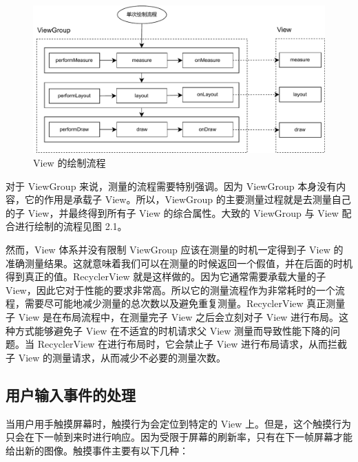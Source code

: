 \begin{figure}
    \centering
    \begin{adjustbox}{max width=\textwidth}
        \includegraphics{assets/view-measure-layout-draw.pdf}
    \end{adjustbox}
    \caption{View 的绘制流程}
\end{figure}

对于 ViewGroup 来说，测量的流程需要特别强调。因为 ViewGroup 本身没有内容，它的作用是承载子 View。所以，ViewGroup 的主要测量过程就是去测量自己的子 View，并最终得到所有子 View 的综合属性。大致的 ViewGroup 与 View 配合进行绘制的流程见图 2.1。

然而，View 体系并没有限制 ViewGroup 应该在测量的时机一定得到子 View 的准确测量结果。这就意味着我们可以在测量的时候返回一个假值，并在后面的时机得到真正的值。RecyclerView 就是这样做的。因为它通常需要承载大量的子 View，因此它对于性能的要求非常高。所以它的测量流程作为非常耗时的一个流程，需要尽可能地减少测量的总次数以及避免重复测量。RecyclerView 真正测量子 View 是在布局流程中，在测量完子 View 之后会立刻对子 View 进行布局。这种方式能够避免子 View 在不适宜的时机请求父 View 测量而导致性能下降的问题。当 RecyclerView 在进行布局时，它会禁止子 View 进行布局请求，从而拦截子 View 的测量请求，从而减少不必要的测量次数。


\subsection{用户输入事件的处理}

当用户用手触摸屏幕时，触摸行为会定位到特定的 View 上。但是，这个触摸行为只会在下一帧到来时进行响应。因为受限于屏幕的刷新率，只有在下一帧屏幕才能给出新的图像。触摸事件主要有以下几种：


